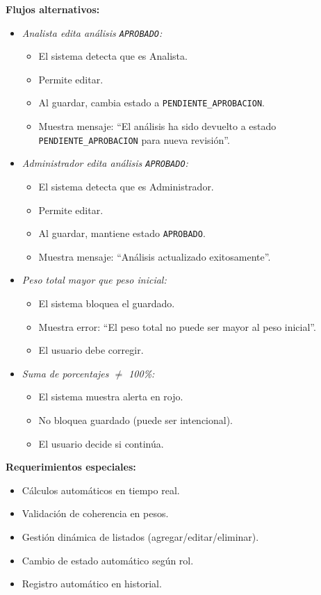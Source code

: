 \vspace{0.5em}
\noindent\textbf{Flujos alternativos:}
\begin{itemize}[nosep]
    \item \textit{Analista edita análisis \texttt{APROBADO}:}
    \begin{itemize}[nosep]
        \item El sistema detecta que es Analista.
        \item Permite editar.
        \item Al guardar, cambia estado a \texttt{PENDIENTE\_APROBACION}.
        \item Muestra mensaje: ``El análisis ha sido devuelto a estado \texttt{PENDIENTE\_APROBACION} para nueva revisión''.
    \end{itemize}
    \item \textit{Administrador edita análisis \texttt{APROBADO}:}
    \begin{itemize}[nosep]
        \item El sistema detecta que es Administrador.
        \item Permite editar.
        \item Al guardar, mantiene estado \texttt{APROBADO}.
        \item Muestra mensaje: ``Análisis actualizado exitosamente''.
    \end{itemize}
    \item \textit{Peso total mayor que peso inicial:}
    \begin{itemize}[nosep]
        \item El sistema bloquea el guardado.
        \item Muestra error: ``El peso total no puede ser mayor al peso inicial''.
        \item El usuario debe corregir.
    \end{itemize}
    \item \textit{Suma de porcentajes $\neq$ 100\%:}
    \begin{itemize}[nosep]
        \item El sistema muestra alerta en rojo.
        \item No bloquea guardado (puede ser intencional).
        \item El usuario decide si continúa.
    \end{itemize}
\end{itemize}

\vspace{0.5em}
\noindent\textbf{Requerimientos especiales:}
\begin{itemize}[nosep]
    \item Cálculos automáticos en tiempo real.
    \item Validación de coherencia en pesos.
    \item Gestión dinámica de listados (agregar/editar/eliminar).
    \item Cambio de estado automático según rol.
    \item Registro automático en historial.
\end{itemize}
